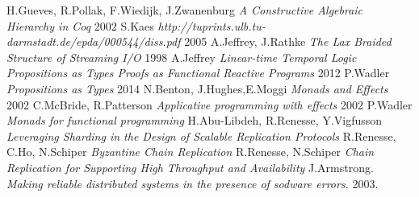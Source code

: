\documentclass[11pt,oneside]{article}
\begin{document}
\begin{thebibliography}{9}
   H.Gueves, R.Pollak, F.Wiedijk, J.Zwanenburg \textit{A Constructive Algebraic Hierarchy in Coq} 2002
     S.Kaes \textit{http://tuprints.ulb.tu-darmstadt.de/epda/000544/diss.pdf} 2005
   A.Jeffrey, J.Rathke \textit{The Lax Braided Structure of Streaming I/O} 1998
     A.Jeffrey \textit{Linear-time Temporal Logic Propositions as Types Proofs as Functional Reactive Programs} 2012
   P.Wadler \textit{Propositions as Types} 2014
       N.Benton, J.Hughes,E.Moggi \textit{Monads and Effects} 2002
   C.McBride, R.Patterson \textit{Applicative programming with effects} 2002
      P.Wadler \textit{Monads for functional programming} 
 H.Abu-Libdeh, R.Renesse, Y.Vigfusson \textit{Leveraging Sharding in the Design of Scalable Replication Protocols}
 R.Renesse, C.Ho, N.Schiper \textit{Byzantine Chain Replication}
 R.Renesse, N.Schiper \textit{Chain Replication for Supporting High Throughput and Availability}
      J.Armstrong. \textit{Making reliable distributed systems in the presence of sodware errors.} 2003.

\end{thebibliography}
\end{document}
